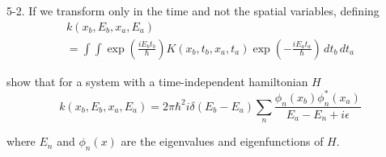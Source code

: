 \documentclass[12pt]{article}
\begin{document}
5-2. If we transform only in the time and not the spatial variables,
defining
\begin{multline*}
k(x_b,E_b,x_a,E_a)
\\
=\int\int
\exp\left(\frac{iE_bt_b}{\hbar}\right)
K(x_b,t_b,x_a,t_a)
\exp\left(-\frac{iE_at_a}{\hbar}\right)
\,dt_b\,dt_a
\tag{5.20}
\end{multline*}

show that for a system with a time-independent hamiltonian $H$
\begin{equation*}
k(x_b,E_b,x_a,E_a)=2\pi\hbar^2i\delta(E_b-E_a)\sum_n
\frac{\phi_n(x_b)\phi_n^*(x_a)}{E_a-E_n+i\epsilon}
\end{equation*}

where $E_n$ and $\phi_n(x)$ are the eigenvalues and eigenfunctions of $H$.
\end{document}
